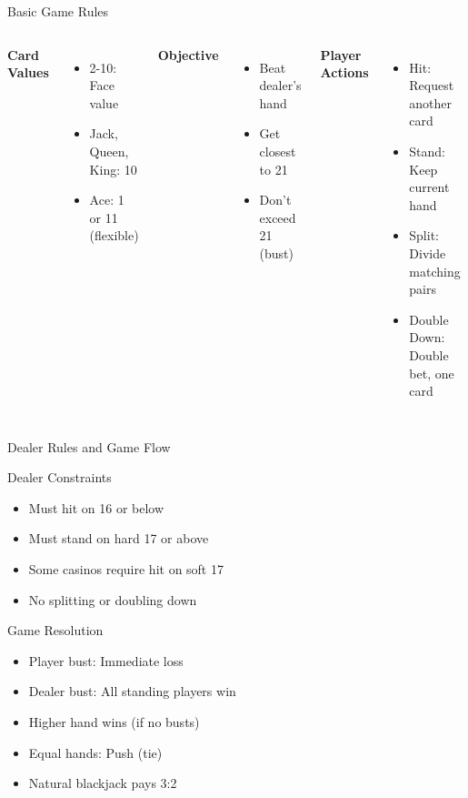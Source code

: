 \documentclass{beamer}
\begin{document}
\begin{frame}{Basic Game Rules}
    \begin{columns}
        \textbf{Card Values}
        \begin{itemize}
            \item 2-10: Face value
            \item Jack, Queen, King: 10
            \item Ace: 1 or 11 (flexible)
        \end{itemize}
        
        \textbf{Objective}
        \begin{itemize}
            \item Beat dealer's hand
            \item Get closest to 21
            \item Don't exceed 21 (bust)
        \end{itemize}
        
        \textbf{Player Actions}
        \begin{itemize}
            \item Hit: Request another card
            \item Stand: Keep current hand
            \item Split: Divide matching pairs
            \item Double Down: Double bet, one card
        \end{itemize}
    \end{columns}
\end{frame}

\begin{frame}{Dealer Rules and Game Flow}
    \begin{block}{Dealer Constraints}
        \begin{itemize}
            \item Must hit on 16 or below
            \item Must stand on hard 17 or above
            \item Some casinos require hit on soft 17
            \item No splitting or doubling down
        \end{itemize}
    \end{block}
    
    \begin{block}{Game Resolution}
        \begin{itemize}
            \item Player bust: Immediate loss
            \item Dealer bust: All standing players win
            \item Higher hand wins (if no busts)
            \item Equal hands: Push (tie)
            \item Natural blackjack pays 3:2
        \end{itemize}
    \end{block}
\end{frame}
\end{document}
